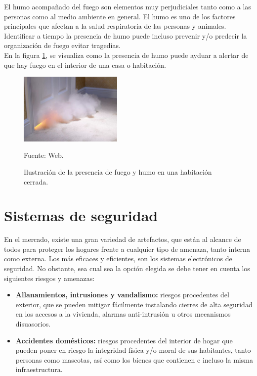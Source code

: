 El humo acompañado del fuego son elementos muy perjudiciales tanto como a las personas como al medio ambiente en general. El humo es uno de los factores principales que afectan a la salud respiratoria de las personas y animales. Identificar a tiempo la presencia de humo puede incluso prevenir y/o predecir la organización de fuego  evitar tragedias.\\

En la figura \ref{fig:humo}, se visualiza como la presencia de humo puede ayduar a alertar de que hay fuego en el interior de una casa o habitación.\\

\begin{figure}[H]
    \begin{center}
        \includegraphics[width=5cm]{img/capitulo_3/fuego_en_el_cuarto.jpg}
    \end{center}
    \begin{center}
        \caption{Ilustración de la presencia de fuego y humo en una habitación cerrada.}
        Fuente: Web.
        \label{fig:humo}
    \end{center}
\end{figure}

\section{Sistemas de seguridad}
En el mercado, existe una gran variedad de artefactos, que están al alcance de todos para proteger los hogares frente a cualquier tipo de amenaza, tanto interna como externa. Los más eficaces y eficientes, son los sistemas electrónicos de seguridad. No obstante, sea cual sea la opción elegida se debe tener en cuenta los siguientes riesgos y amenazas:\\

\begin{itemize}
    \item \textbf{Allanamientos, intrusiones y vandalismo:} riesgos procedentes del exterior, que se pueden mitigar fácilmente instalando cierres de alta seguridad en los accesos a la vivienda, alarmas anti-intrusión u otros mecanismos disuasorios.
    \item \textbf{Accidentes domésticos:} riesgos procedentes del interior de hogar que pueden poner en riesgo la integridad física y/o moral de sus habitantes, tanto personas como mascotas, así como los bienes que contienen e incluso la misma infraestructura.
\end{itemize}

